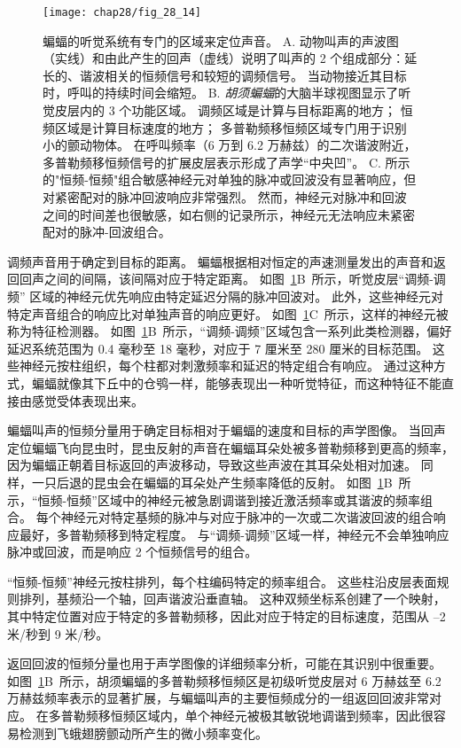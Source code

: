 \begin{figure}[htbp]
	\centering
	\texttt{[image: chap28/fig\_28\_14]}
	\caption{蝙蝠的听觉系统有专门的区域来定位声音。
		A. 动物叫声的声波图（实线）和由此产生的回声（虚线）说明了叫声的 2 个组成部分：延长的、谐波相关的恒频信号和较短的调频信号。
		当动物接近其目标时，呼叫的持续时间会缩短\cite{suga1984neural}。
		B. \textit{胡须蝙蝠}的大脑半球视图显示了听觉皮层内的 3 个功能区域。
		调频区域是计算与目标距离的地方；
		恒频区域是计算目标速度的地方；
		多普勒频移恒频区域专门用于识别小的颤动物体。
		在呼叫频率（6 万到 6.2 万赫兹）的二次谐波附近，多普勒频移恒频信号的扩展皮层表示形成了声学“中央凹”\cite{suga1984neural}。
		C. 所示的"恒频-恒频"组合敏感神经元对单独的脉冲或回波没有显著响应，但对紧密配对的脉冲回波响应非常强烈。
		然而，神经元对脉冲和回波之间的时间差也很敏感，如右侧的记录所示，神经元无法响应未紧密配对的脉冲-回波组合\cite{suga1983specificity}。}
	\label{fig:28_14}
\end{figure}


调频声音用于确定到目标的距离。
蝙蝠根据相对恒定的声速测量发出的声音和返回回声之间的间隔，该间隔对应于特定距离。
如图~\ref{fig:28_14}B~所示，听觉皮层“调频-调频” 区域的神经元优先响应由特定延迟分隔的脉冲回波对。
此外，这些神经元对特定声音组合的响应比对单独声音的响应更好。
如图~\ref{fig:28_14}C~所示，这样的神经元被称为特征检测器。
如图~\ref{fig:28_14}B~所示，“调频-调频”区域包含一系列此类检测器，偏好延迟系统范围为 0.4 毫秒至 18 毫秒，对应于 7 厘米至 280 厘米的目标范围。
这些神经元按柱组织，每个柱都对刺激频率和延迟的特定组合有响应。
通过这种方式，蝙蝠就像其下丘中的仓鸮一样，能够表现出一种听觉特征，而这种特征不能直接由感觉受体表现出来。


蝙蝠叫声的恒频分量用于确定目标相对于蝙蝠的速度和目标的声学图像。
当回声定位蝙蝠飞向昆虫时，昆虫反射的声音在蝙蝠耳朵处被多普勒频移到更高的频率，因为蝙蝠正朝着目标返回的声波移动，导致这些声波在其耳朵处相对加速。
同样，一只后退的昆虫会在蝙蝠的耳朵处产生频率降低的反射。
如图~\ref{fig:28_14}B~所示，“恒频-恒频”区域中的神经元被急剧调谐到接近激活频率或其谐波的频率组合。
每个神经元对特定基频的脉冲与对应于脉冲的一次或二次谐波回波的组合响应最好，多普勒频移到特定程度。
与“调频-调频”区域一样，神经元不会单独响应脉冲或回波，而是响应 2 个恒频信号的组合。


“恒频-恒频”神经元按柱排列，每个柱编码特定的频率组合。
这些柱沿皮层表面规则排列，基频沿一个轴，回声谐波沿垂直轴。
这种双频坐标系创建了一个映射，其中特定位置对应于特定的多普勒频移，因此对应于特定的目标速度，范围从 –2 米/秒到 9 米/秒。


返回回波的恒频分量也用于声学图像的详细频率分析，可能在其识别中很重要。
如图~\ref{fig:28_14}B~所示，胡须蝙蝠的多普勒频移恒频区是初级听觉皮层对 6 万赫兹至 6.2 万赫兹频率表示的显著扩展，与蝙蝠叫声的主要恒频成分的一组返回回波非常对应。
在多普勒频移恒频区域内，单个神经元被极其敏锐地调谐到频率，因此很容易检测到飞蛾翅膀颤动所产生的微小频率变化。


